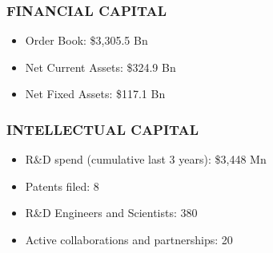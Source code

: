 \subsubsection{FINANCIAL CAPITAL}
\begin{itemize}
  \item Order Book: \$3,305.5 Bn
  \item Net Current Assets: \$324.9 Bn 
  \item Net Fixed Assets: \$117.1 Bn
\end{itemize}

\subsubsection{INTELLECTUAL CAPITAL}
\begin{itemize}
  \item R\&D spend (cumulative last 3 years): \$3,448 Mn 
  \item Patents filed: 8
  \item R\&D Engineers and Scientists: 380
  \item Active collaborations and partnerships: 20
\end{itemize}


